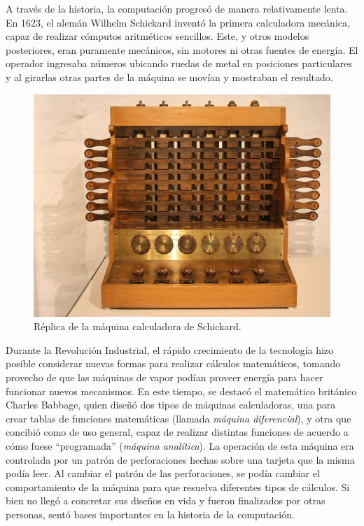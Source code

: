 \documentclass[]{book}
\begin{document}
A través de la historia, la computación progresó de manera relativamente
lenta. En 1623, el alemán Wilhelm Schickard inventó la primera
calculadora mecánica, capaz de realizar cómputos aritméticos sencillos.
Este, y otros modelos posteriores, eran puramente mecánicos, sin motores
ni otras fuentes de energía. El operador ingresaba números ubicando
ruedas de metal en posiciones particulares y al girarlas otras partes de
la máquina se movían y mostraban el resultado.

\begin{figure}

{\centering \includegraphics[width=0.5\linewidth]{images/01_calculadora} 

}

\caption{Réplica de la máquina calculadora de Schickard.}\label{fig:calculadora}
\end{figure}

Durante la Revolución Industrial, el rápido crecimiento de la tecnología
hizo posible considerar nuevas formas para realizar cálculos
matemáticos, tomando provecho de que las máquinas de vapor podían
proveer energía para hacer funcionar nuevos mecanismos. En este tiempo,
se destacó el matemático británico Charles Babbage, quien diseñó dos
tipos de máquinas calculadoras, una para crear tablas de funciones
matemáticas (llamada \emph{máquina diferencial}), y otra que concibió
como de uso general, capaz de realizar distintas funciones de acuerdo a
cómo fuese ``programada'' (\emph{máquina analítica}). La operación de
esta máquina era controlada por un patrón de perforaciones hechas sobre
una tarjeta que la misma podía leer. Al cambiar el patrón de las
perforaciones, se podía cambiar el comportamiento de la máquina para que
resuelva diferentes tipos de cálculos. Si bien no llegó a concretar sus
diseños en vida y fueron finalizados por otras personas, sentó bases
importantes en la historia de la computación.
\end{document}
